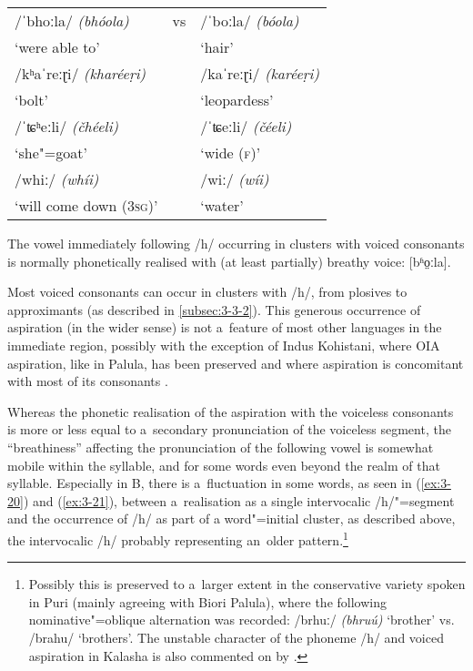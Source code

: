 \begin{exe}
\extab
\label{ex:3-18}
\begin{tabularx}{116mm}{ l l l }
/ˈbhoːla/ \textit{(bhóola)} &
vs &
/ˈboːla/ \textit{(bóola)}\\
`were able to' &
&
`hair'\\
/kʰaˈreːɽi/ \textit{(kharéeṛi)} &
&
/kaˈreːɽi/ \textit{(karéeṛi)}\\
`bolt' &
&
`leopardess'\\
/ˈʨʰeːli/ \textit{(čhéeli)} &
&
/ˈʨeːli/ \textit{(čéeli)}\\
`she"=goat' &
&
`wide (\textsc{f})'\\
/whiː/ \textit{(whíi)} &
&
/wiː/ \textit{(wíi)}\\
`will come down (\textsc{3sg})' &
&
`water'\\
\end{tabularx}
\end{exe}


The vowel immediately following /h/ occurring in clusters with voiced consonants is normally phonetically realised with (at least partially) breathy voice: [bʱo̤ːla]. 


Most voiced consonants can occur in clusters with /h/, from plosives to approximants (as described in \ref{subsec:3-3-2}). This generous occurrence of aspiration (in the wider sense) is not a~feature of most other languages in the immediate region, possibly with the exception of Indus Kohistani, where OIA aspiration, like in Palula, has been preserved and where aspiration is concomitant with most of its consonants \citep[19--25]{hallberghallberg1999}. 


Whereas the phonetic realisation of the aspiration with the voiceless consonants is more or less equal to a~secondary pronunciation of the voiceless segment, the ``breathiness'' affecting the pronunciation of the following vowel is somewhat mobile within the syllable, and for some words even beyond the realm of that syllable. Especially in B, there is a~fluctuation in some words, as seen in (\ref{ex:3-20}) and (\ref{ex:3-21}), between a~realisation as a single intervocalic /h/"=segment and the occurrence of /h/ as part of a word"=initial cluster, as described above, the intervocalic /h/ probably representing an~older pattern.\footnote{Possibly this is preserved to a~larger extent in the conservative variety spoken in Puri (mainly agreeing with Biori Palula), where the following nominative"=oblique alternation was recorded: /brhuː/ \textit{(bhruú)} `brother' vs. /brahu/ `brothers'. The unstable character of the phoneme /h/ and voiced aspiration in Kalasha is also commented on by \citet[50]{morchheegaard1997}.}

